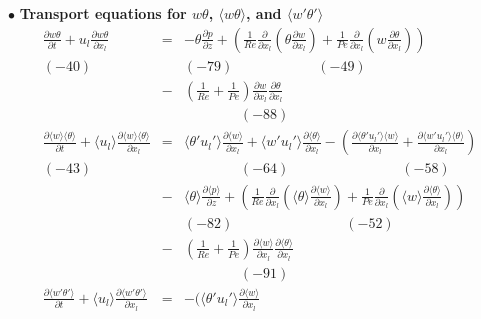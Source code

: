 \documentclass[a4paper,11pt]{article}
\begin{document}
\noindent $\bullet$  \textbf{Transport equations for $w\theta$, $\langle w\theta\rangle$, and $\langle w'\theta'\rangle$}
\begin{eqnarray}
\frac{\partial w\theta }{\partial t}
+u_l\frac{\partial w\theta }{\partial x_l}
&=&-\theta\frac{\partial  p}{\partial z}
+(\frac{1}{Re}\frac{\partial }{\partial x_l}(\theta\frac{\partial w }{\partial x_l})+\frac{1}{Pe}\frac{\partial }{\partial x_l}(w\frac{\partial \theta }{\partial x_l}) )\nonumber \\
(-40)    && (-79) \qquad{} \quad{}\quad{} \qquad{} (-49) \nonumber \\
&-&(\frac{1}{Re}+\frac{1}{Pe})\frac{\partial w }{\partial x_l}\frac{\partial \theta }{\partial x_l}  \\ 
&&  \qquad{} \qquad{} (-88) \nonumber \\
\frac{\partial \langle w\rangle \langle \theta\rangle }{\partial t}
+\langle u_l\rangle \frac{\partial \langle w\rangle \langle \theta\rangle }{\partial x_l}
&=&\langle \theta'u_l'\rangle \frac{\partial \langle w \rangle}{\partial x_l}+\langle w'u_l'\rangle \frac{\partial \langle \theta \rangle  }{\partial x_l}
-(\frac{\partial \langle \theta'u_l'\rangle \langle w \rangle }{\partial x_l}+\frac{\partial \langle w'u_l'\rangle \langle \theta \rangle }{\partial x_l}) \nonumber \\
(-43) \quad{}   && \qquad{} \qquad{} (-64)\quad{}\quad{}\quad{} \qquad{}\quad{}\qquad{} (-58) \nonumber \\
&-&\langle \theta  \rangle \frac{\partial \langle p \rangle }{\partial z} 
+(\frac{1}{Re}\frac{\partial}{\partial x_l}(\langle \theta\rangle \frac{\partial \langle w\rangle}{\partial x_l}) + \frac{1}{Pe}\frac{\partial}{\partial x_l}(\langle w \rangle \frac{\partial \langle \theta\rangle}{\partial x_l})) \nonumber \\
&& (-82) \qquad{} \qquad{} \quad{}\quad{}\qquad{} (-52) \nonumber \\
&-&(\frac{1}{Re}+\frac{1}{Pe})\frac{\partial \langle w\rangle }{\partial x_l}\frac{\partial \langle \theta \rangle}{\partial x_l} \\
&&  \qquad{} \qquad{} (-91) \nonumber \\
\frac{\partial \langle w'\theta'\rangle }{\partial t}
+\langle u_l\rangle \frac{\partial \langle w'\theta'\rangle }{\partial x_l}
&=&-(\langle \theta'u_l'\rangle \frac{\partial \langle w \rangle  }{\partial x_l}

\end{eqnarray}
\end{document}
